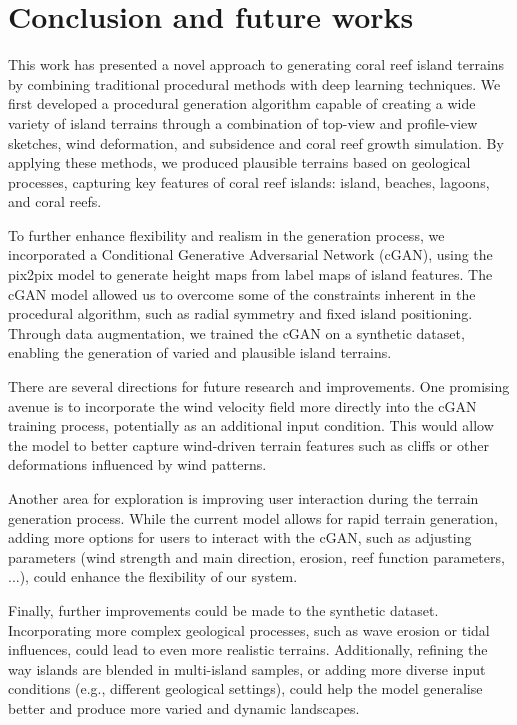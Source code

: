 \section{Conclusion and future works}
\label{sec:coral-island-conclusion}

This work has presented a novel approach to generating coral reef island terrains by combining traditional procedural methods with deep learning techniques. We first developed a procedural generation algorithm capable of creating a wide variety of island terrains through a combination of top-view and profile-view sketches, wind deformation, and subsidence and coral reef growth simulation. By applying these methods, we produced plausible terrains based on geological processes, capturing key features of coral reef islands: island, beaches, lagoons, and coral reefs.

To further enhance flexibility and realism in the generation process, we incorporated a Conditional Generative Adversarial Network (cGAN), using the pix2pix model to generate height maps from label maps of island features. The cGAN model allowed us to overcome some of the constraints inherent in the procedural algorithm, such as radial symmetry and fixed island positioning. Through data augmentation, we trained the cGAN on a synthetic dataset, enabling the generation of varied and plausible island terrains.


There are several directions for future research and improvements. One promising avenue is to incorporate the wind velocity field more directly into the cGAN training process, potentially as an additional input condition. This would allow the model to better capture wind-driven terrain features such as cliffs or other deformations influenced by wind patterns.

Another area for exploration is improving user interaction during the terrain generation process. While the current model allows for rapid terrain generation, adding more options for users to interact with the cGAN, such as adjusting parameters (wind strength and main direction, erosion, reef function parameters, ...), could enhance the flexibility of our system.

Finally, further improvements could be made to the synthetic dataset. Incorporating more complex geological processes, such as wave erosion or tidal influences, could lead to even more realistic terrains. Additionally, refining the way islands are blended in multi-island samples, or adding more diverse input conditions (e.g., different geological settings), could help the model generalise better and produce more varied and dynamic landscapes.

